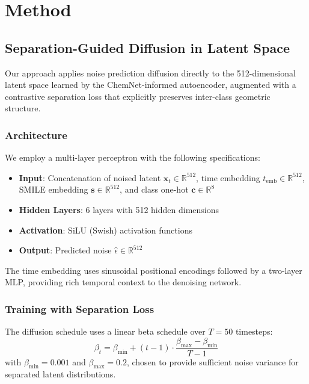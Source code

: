 \documentclass[sigconf]{acmart}
\begin{document}
\section{Method}

\subsection{Separation-Guided Diffusion in Latent Space}

Our approach applies noise prediction diffusion directly to the 512-dimensional latent space learned by the ChemNet-informed autoencoder, augmented with a contrastive separation loss that explicitly preserves inter-class geometric structure.

\subsubsection{Architecture}

We employ a multi-layer perceptron with the following specifications:
\begin{itemize}
    \item \textbf{Input}: Concatenation of noised latent $\mathbf{x}_t \in \mathbb{R}^{512}$, time embedding $t_{\text{emb}} \in \mathbb{R}^{512}$, SMILE embedding $\mathbf{s} \in \mathbb{R}^{512}$, and class one-hot $\mathbf{c} \in \mathbb{R}^8$
    \item \textbf{Hidden Layers}: 6 layers with 512 hidden dimensions
    \item \textbf{Activation}: SiLU (Swish) activation functions
    \item \textbf{Output}: Predicted noise $\hat{\epsilon} \in \mathbb{R}^{512}$
\end{itemize}

The time embedding uses sinusoidal positional encodings followed by a two-layer MLP, providing rich temporal context to the denoising network.

\subsubsection{Training with Separation Loss}

The diffusion schedule uses a linear beta schedule over $T=50$ timesteps:
\begin{equation}
\beta_t = \beta_{\text{min}} + (t-1) \cdot \frac{\beta_{\text{max}} - \beta_{\text{min}}}{T-1}
\end{equation}
with $\beta_{\text{min}} = 0.001$ and $\beta_{\text{max}} = 0.2$, chosen to provide sufficient noise variance for separated latent distributions.
\end{document}
